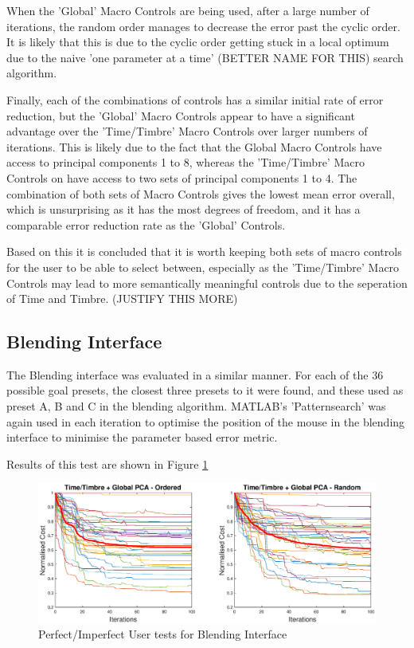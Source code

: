 \documentclass[11pt, oneside]{report}   	%
\begin{document}
When the 'Global' Macro Controls are being used, after a large number of iterations, the random order manages to decrease the error past the cyclic order. It is likely that this is due to the cyclic order getting stuck in a local optimum due to the naive 'one parameter at a time' (BETTER NAME FOR THIS) search algorithm.

Finally, each of the combinations of controls has a similar initial rate of error reduction, but the 'Global' Macro Controls appear to have a significant advantage over the 'Time/Timbre' Macro Controls over larger numbers of iterations. This is likely due to the fact that the Global Macro Controls have access to principal components 1 to 8, whereas the 'Time/Timbre' Macro Controls on have access to two sets of principal components 1 to 4. The combination of both sets of Macro Controls gives the lowest mean error overall, which is unsurprising as it has the most degrees of freedom, and it has a comparable error reduction rate as the 'Global' Controls.

Based on this it is concluded that it is worth keeping both sets of macro controls for the user to be able to select between, especially as the 'Time/Timbre' Macro Controls may lead to more semantically meaningful controls due to the seperation of Time and Timbre. (JUSTIFY THIS MORE)

\subsection{Blending Interface} 
The Blending interface was evaluated in a similar manner. For each of the 36 possible goal presets, the closest three presets to it were found, and these used as preset A, B and C in the blending algorithm. MATLAB's 'Patternsearch' was again used in each iteration to optimise the position of the mouse in the blending interface to minimise the parameter based error metric. 

Results of this test are shown in Figure \ref{fig:BlendingTest1}
\begin{figure}
	\centering
	\includegraphics[width = \textwidth]{PCAInterfaceTests1.eps}
	\caption{Perfect/Imperfect User tests for Blending Interface}
	\label{fig:BlendingTest1}
\end{figure}
\end{document}
